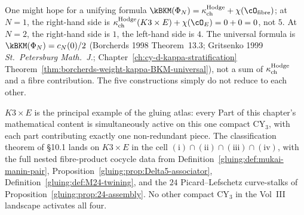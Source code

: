 \begin{remark}[The attempted reduction $\kBKM(\Phi_N) = \kch^{\mathrm{Hodge}} + \chi(\cO_{\mathrm{fibre}})$ fails]
\label{gluing:rem:failed-reduction}
One might hope for a unifying formula $\kBKM(\Phi_N) = \kch^{\mathrm{Hodge}} +
\chi(\cO_{\mathrm{fibre}})$; at $N = 1$, the right-hand side is
$\kch^{\mathrm{Hodge}}(K3 \times E) + \chi(\cO_E) = 0 + 0 = 0$, not $5$. At $N = 2$,
the right-hand side is $1$, the left-hand side is $4$. The universal
formula is $\kBKM(\Phi_N) = c_N(0)/2$ (Borcherds 1998 Theorem~13.3;
Gritsenko 1999 \emph{St.\ Petersburg Math.\ J.}; Chapter~\ref{ch:cy-d-kappa-stratification}
Theorem~\ref{thm:borcherds-weight-kappa-BKM-universal}), not a
sum of $\kappa_{\mathrm{ch}}^{\mathrm{Hodge}}$ and a fibre contribution. The five constructions
simply do not reduce to each other.
\end{remark}

\begin{remark}
\label{gluing:rem:master-example}
$K3 \times E$ is the principal example of the gluing atlas: every
Part of this chapter's mathematical content is simultaneously
active on this one compact CY$_3$, with each part contributing
exactly one non-redundant piece. The classification theorem of
\S 10.1 lands on $K3 \times E$ in the cell
$(\text{i}) \cap (\text{ii}) \cap (\text{iii}) \cap (\text{iv})$,
with the full nested fibre-product cocycle data from
Definition~\ref{gluing:def:mukai-manin-pair},
Proposition~\ref{gluing:prop:Delta5-associator},
Definition~\ref{gluing:def:M24-twining}, and the $24$ Picard--Lefschetz
curve-stalks of Proposition~\ref{gluing:prop:24-assembly}. No other
compact CY$_3$ in the Vol~III landscape activates all four.
\end{remark}

